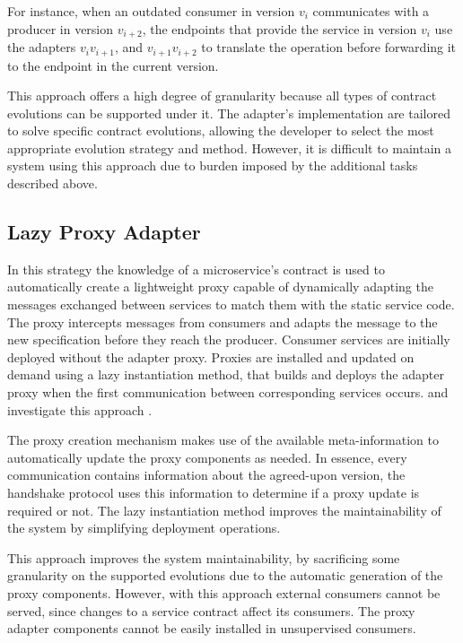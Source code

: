 For instance, when an outdated consumer in version $v_i$ communicates with a producer in version $v_{i+2}$, the endpoints that provide the service
in version $v_i$ use the adapters $v_i$\textrightarrow$v_{i+1}$, and $v_{i+1}$\textrightarrow$v_{i+2}$ to translate the operation before forwarding it to the endpoint in the current version.

This approach offers a high degree of granularity because all types of contract evolutions can be supported under it.
The adapter's implementation are tailored to solve specific contract evolutions, allowing the developer to select the most appropriate evolution strategy and method.
However, it is difficult to maintain a system using this approach due to burden imposed by the additional tasks described above.

\subsection{Lazy Proxy Adapter} %
\label{sec:proxy_adapter}

In this strategy the knowledge of a microservice’s
contract is used to automatically create a lightweight proxy capable of dynamically adapting the messages exchanged between services to match them with the static service code.
The proxy intercepts messages from consumers and adapts the message to the new specification before they reach the producer.
Consumer services are initially deployed without the adapter proxy.
Proxies are installed and updated on demand using a lazy instantiation method, that builds and deploys the adapter proxy when the first communication between corresponding services occurs.
\citeauthor{seco2020robust} and \citeauthor{santosregent} investigate this approach \cite{seco2020robust, santosregent}.

The proxy creation mechanism makes use of the available meta-information
to automatically update the proxy components as needed.
In essence, every communication contains information about the agreed-upon version, the handshake protocol uses this information to determine if a proxy update is required or not.
The lazy instantiation method improves the maintainability of the system by
simplifying deployment operations.

This approach improves the system maintainability, by sacrificing some granularity on the supported evolutions due to the automatic generation of the proxy components.
However, with this approach external consumers cannot be served, since changes to a service contract affect its consumers.
The proxy adapter components cannot be easily installed in unsupervised consumers.

